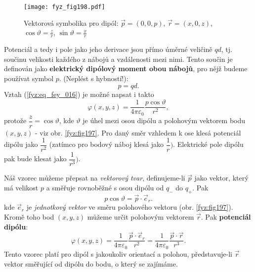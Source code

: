 {  \begin{figure}[ht!] %
    \centering
    \texttt{[image: fyz\_fig198.pdf]}
    \caption{Vektorová symbolika pro dipól: \(\vec{p} = (0, 0, p)\), \(\vec{r} = (x, 0, z)\), 
             \(\cos\vartheta = \frac{z}{r}\), \(\sin\vartheta = \frac{x}{r}\)}
    \label{fyz:fig198}
  \end{figure}
  Potenciál a tedy i pole jako jeho derivace jsou přímo úměrné veličině \(qd\), tj. součinu 
  velikosti každého z nábojů a vzdálenosti mezi nimi. Tento součin je definován jako 
  \textbf{elektrický dipólový moment obou nábojů}, pro nějž budeme používat symbol \(p\). 
  (Neplést s hybností!):
  \begin{equation}\label{fyz:eq_fey_017}
    p = qd.
  \end{equation}
  Vztah (\ref{fyz:eq_fey_016}) je možné napsat i takto
  \begin{equation}\label{fyz:eq_fey_018}
    \varphi(x,y,z) = \dfrac{1}{4\pi\varepsilon_0}\dfrac{p\cos\vartheta}{r^2},
  \end{equation}
  protože \(\dfrac{z}{r} = \cos\vartheta\), kde \(\vartheta\) je úhel mezi osou dipólu a 
  polohovým vektorem bodu \((x, y, z)\) - viz obr. \ref{fyz:fig197}. Pro daný směr vzhledem k 
  ose klesá potenciál dipólu jako \(\dfrac{1}{r^2}\) (zatímco pro bodový náboj klesá jako 
  \(\dfrac{1}{r})\). Elektrické pole dipólu pak bude klesat jako \(\dfrac{1}{r^3})\).

  Náš vzorec můžeme přepsat na \emph{vektorový tvar}, definujeme-li \(\vec{p}\) jako vektor, 
  který má velikost \(p\) a směřuje rovnoběžné s osou dipólu od \(q_-\) do \(q_+\). Pak
   \begin{equation}\label{fyz:eq_fey_019}
    p\cos\vartheta = \vec{p}\cdot\vec{e}_r.
  \end{equation}
  kde \(\vec{e}_r\) je \emph{jednotkový vektor} ve směru polohového vektoru (obr. 
  \ref{fyz:fig197}). Kromě toho bod \((x, y, z)\) můžeme určit polohovým vektorem \(\vec{r}\). 
  Pak \textbf{potenciál dipólu}:
  \begin{equation}\label{fyz:eq_fey_020}
    \varphi(x,y,z) = \dfrac{1}{4\pi\varepsilon_0}\dfrac{\vec{p}\cdot\vec{e}_r}{r^2}
                   = \dfrac{1}{4\pi\varepsilon_0}\dfrac{\vec{p}\cdot\vec{r}}{r^3}.
  \end{equation}
  Tento vzorec platí pro dipól s jakoukoliv orientací a polohou, představuje-li \(\vec{r}\) 
  vektor směřující od dipólu do bodu, o který se zajímáme.

}
